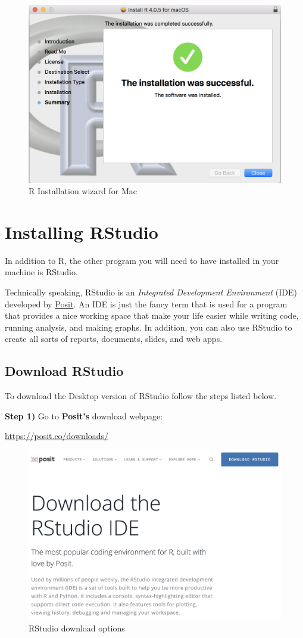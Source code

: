 \documentclass[
]{book}
\begin{document}
\begin{figure}

{\centering \includegraphics[width=0.5\linewidth]{images/install/install-5} 

}

\caption{R Installation wizard for Mac}\label{fig:unnamed-chunk-10}
\end{figure}

\hypertarget{installing-rstudio}{%
\chapter{Installing RStudio}\label{installing-rstudio}}

In addition to R, the other program you will need to have installed in your
machine is RStudio.

Technically speaking, RStudio is an \emph{Integrated Development Environment} (IDE)
developed by \href{https://posit.co}{Posit}. An IDE is just the fancy term that is
used for a program that provides a nice working space that make your life easier
while writing code, running analysis, and making graphs. In addition, you can
also use RStudio to create all sorts of reports, documents, slides, and web apps.

\hypertarget{download-rstudio}{%
\section{Download RStudio}\label{download-rstudio}}

To download the Desktop version of RStudio follow the steps listed below.

\textbf{Step 1)} Go to \textbf{Posit's} download webpage:

\url{https://posit.co/downloads/}

\begin{figure}

{\centering \includegraphics[width=0.7\linewidth]{images/install/posit-rstudio-download} 

}

\caption{RStudio download options}\label{fig:unnamed-chunk-12}
\end{figure}
\end{document}

